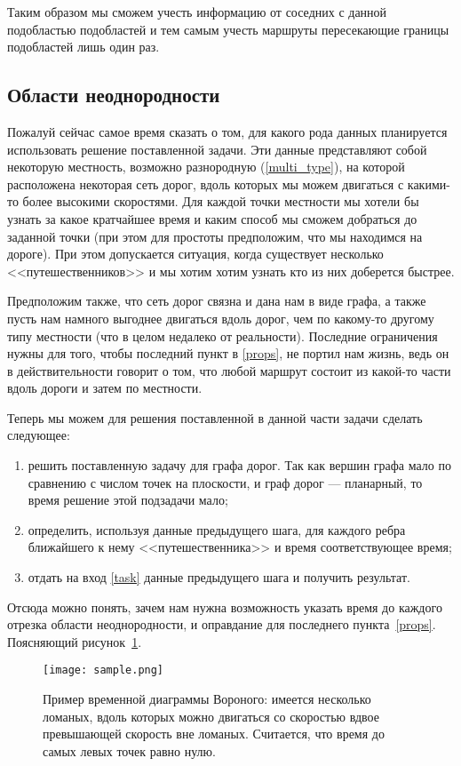 \documentclass[12pt]{article}
\begin{document}
Таким образом мы сможем учесть информацию от соседних с данной подобластью подобластей и тем самым учесть маршруты пересекающие границы подобластей лишь один раз.

\subsection{Области неоднородности}
Пожалуй сейчас самое время сказать о том, для какого рода данных планируется использовать решение поставленной задачи. Эти данные представляют собой некоторую местность, возможно разнородную (\ref{multi_type}), на которой расположена некоторая сеть дорог, вдоль которых мы можем двигаться с какими-то более высокими скоростями. Для каждой точки местности мы хотели бы узнать за какое кратчайшее время и каким способ мы сможем добраться до заданной точки (при этом для простоты предположим, что мы находимся на дороге). При этом допускается ситуация, когда существует несколько  <<путешественников>> и мы хотим хотим узнать кто из них доберется быстрее. 

Предположим также, что сеть дорог связна и дана нам в виде графа, а также пусть нам намного выгоднее двигаться вдоль дорог, чем по какому-то другому типу местности (что в целом недалеко от реальности). Последние ограничения нужны для того, чтобы  последний пункт в \ref{props}, не портил нам жизнь, ведь он в действительности говорит о том, что любой маршрут состоит из какой-то  части вдоль дороги и затем по местности. 

Теперь мы можем для решения поставленной в данной части задачи сделать следующее:
\begin{enumerate}
\item решить поставленную задачу для графа дорог. Так как вершин графа мало по сравнению с числом точек на плоскости, и граф дорог --- планарный, то время решение этой подзадачи мало;
\item определить, используя данные предыдущего шага, для каждого ребра ближайшего к нему <<путешественника>> и время соответствующее время;
\item отдать на вход \ref{task} данные предыдущего шага и получить результат.
\end{enumerate}

Отсюда можно понять, зачем нам нужна возможность указать время до каждого отрезка области неоднородности, и оправдание для последнего пункта~\ref{props}. Поясняющий рисунок~\ref{task_fig}.

\begin{figure}
\center\texttt{[image: sample.png]}
\caption{Пример временной диаграммы Вороного: имеется несколько ломаных, вдоль которых можно двигаться со скоростью вдвое превышающей скорость вне ломаных. Считается, что время до самых левых точек равно нулю.}
\label{task_fig}
\end{figure}
\end{document}
